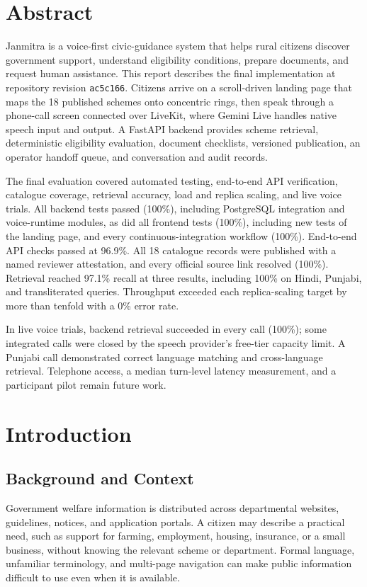 \documentclass[11pt,a4paper,oneside]{report}
\newcommand{\Revision}{ac5c166}
\begin{document}
\hypersetup{pageanchor=true}
\chapter*{Abstract}
Janmitra is a voice-first civic-guidance system that helps rural citizens discover
government support, understand eligibility conditions, prepare documents, and
request human assistance. This report describes the final implementation at
repository revision \texttt{\Revision}. Citizens arrive on a scroll-driven
landing page that maps the 18 published schemes onto concentric rings, then speak
through a phone-call screen connected over LiveKit, where Gemini Live handles
native speech input and output. A FastAPI backend provides scheme retrieval, deterministic eligibility
evaluation, document checklists, versioned publication, an operator handoff queue,
and conversation and audit records.

The final evaluation covered automated testing, end-to-end API verification,
catalogue coverage, retrieval accuracy, load and replica scaling, and live voice
trials. All backend tests passed (100\%), including PostgreSQL integration and
voice-runtime modules, as did all frontend tests (100\%), including new tests of
the landing page, and every continuous-integration workflow (100\%). End-to-end
API checks passed at 96.9\%. All 18 catalogue records were published with a named reviewer
attestation, and every official source link resolved (100\%). Retrieval reached
97.1\% recall at three results, including 100\% on Hindi, Punjabi, and
transliterated queries. Throughput exceeded each replica-scaling target by more
than tenfold with a 0\% error rate.

In live voice trials, backend retrieval succeeded in every call (100\%); some
integrated calls were closed by the speech provider's free-tier capacity limit.
A Punjabi call demonstrated correct language
matching and cross-language retrieval. Telephone access, a median turn-level
latency measurement, and a participant pilot remain future work.

\tableofcontents
\clearpage
{}

\chapter{Introduction}

\section{Background and Context}
Government welfare information is distributed across departmental websites,
guidelines, notices, and application portals. A citizen may describe a practical
need, such as support for farming, employment, housing, insurance, or a
small business, without knowing the relevant scheme or department. Formal language,
unfamiliar terminology, and multi-page navigation can make public information
difficult to use even when it is available.
\end{document}
